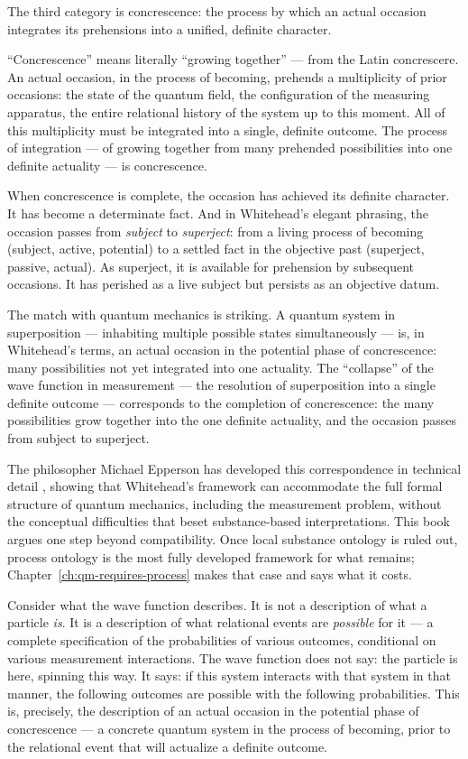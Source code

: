 The third category is concrescence: the process by which an actual occasion integrates its prehensions into a unified, definite character.

``Concrescence'' means literally ``growing together'' --- from the Latin concrescere. An actual occasion, in the process of becoming, prehends a multiplicity of prior occasions: the state of the quantum field, the configuration of the measuring apparatus, the entire relational history of the system up to this moment. All of this multiplicity must be integrated into a single, definite outcome. The process of integration --- of growing together from many prehended possibilities into one definite actuality --- is concrescence.

When concrescence is complete, the occasion has achieved its definite character. It has become a determinate fact. And in Whitehead's elegant phrasing, the occasion passes from \emph{subject} to \emph{superject}: from a living process of becoming (subject, active, potential) to a settled fact in the objective past (superject, passive, actual). As superject, it is available for prehension by subsequent occasions. It has perished as a live subject but persists as an objective datum.

The match with quantum mechanics is striking. A quantum system in superposition --- inhabiting multiple possible states simultaneously --- is, in Whitehead's terms, an actual occasion in the potential phase of concrescence: many possibilities not yet integrated into one actuality. The ``collapse'' of the wave function in measurement --- the resolution of superposition into a single definite outcome --- corresponds to the completion of concrescence: the many possibilities grow together into the one definite actuality, and the occasion passes from subject to superject.

The philosopher Michael Epperson has developed this correspondence in technical detail \citep{Epperson2004}, showing that Whitehead's framework can accommodate the full formal structure of quantum mechanics, including the measurement problem, without the conceptual difficulties that beset substance-based interpretations. This book argues one step beyond compatibility. Once local substance ontology is ruled out, process ontology is the most fully developed framework for what remains; Chapter~\ref{ch:qm-requires-process} makes that case and says what it costs.

Consider what the wave function describes. It is not a description of what a particle \emph{is}. It is a description of what relational events are \emph{possible} for it --- a complete specification of the probabilities of various outcomes, conditional on various measurement interactions. The wave function does not say: the particle is here, spinning this way. It says: if this system interacts with that system in that manner, the following outcomes are possible with the following probabilities. This is, precisely, the description of an actual occasion in the potential phase of concrescence --- a concrete quantum system in the process of becoming, prior to the relational event that will actualize a definite outcome.

